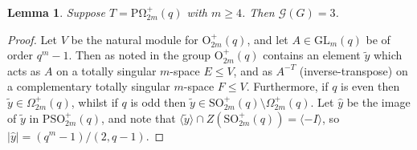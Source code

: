 \documentclass[twoside,a4paper,reqno,11pt]{amsart}
\newcommand{\<}{\langle}
\renewcommand{\>}{\rangle}
\newcommand{\la}{\langle}
\newcommand{\ra}{\rangle}
\newcommand{\leqs}{\leqslant}
\newcommand{\geqs}{\geqslant}
\def\ge{\geqs}
\def\le{\leqs}
\newcommand{\GL}{\mathrm{GL}}
\newcommand{\POmega}{\mathrm{P\Omega}}
\newtheorem{lem}[thm]{Lemma}
\theoremstyle{definition}
\begin{document}
\begin{lem}
	\label{l:o+}
	Suppose $T = \POmega_{2m}^+(q)$ with $m \ge 4$. Then $\mathcal{G}(G) = 3$.
\end{lem}

\begin{proof}
	Let $V$ be the natural module for $\mathrm{O}^+_{2m}(q)$, and let $A \in \GL_m(q)$ be of order $q^m-1$. Then as noted in \cite[Lemma 1.2.2]{Kleidman} the group $\mathrm{O}^+_{2m}(q)$ contains an element $\widetilde{y}$ which acts as $A$ on a totally singular $m$-space $E \le V$, and as $A^{-T}$ (inverse-transpose) on a complementary totally singular $m$-space $F \le V$. %
    Furthermore, if $q$ is even then $\widetilde{y} \in \Omega_{2m}^+(q)$, whilst if $q$ is odd then $\widetilde{y} \in \mathrm{SO}^+_{2m}(q) \setminus \Omega^+_{2m}(q)$.
    Let $\widehat{y}$ be the image of $\widetilde{y}$ in $\mathrm{PSO}_{2m}^+(q)$, and note that $\la \widetilde{y} \ra \cap Z(\mathrm{SO}_{2m}^+(q)) = \la -I\ra$, %
    so $|\widehat{y}| = %
    (q^m-1)/(2,q-1)$. 
    

\end{proof}
\end{document}

